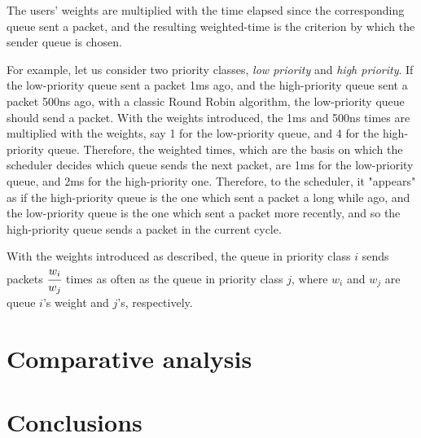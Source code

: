 \documentclass[12pt]{article}
\begin{document}
        The users' weights are multiplied with the time elapsed since the corresponding queue sent a packet, and the resulting weighted-time is the criterion by which the sender queue is chosen.

        For example, let us consider two priority classes, \textit{low priority} and \textit{high priority}. If the low-priority queue sent a packet 1ms ago, and the high-priority queue sent a packet 500ns ago, with a classic Round Robin algorithm, the low-priority queue should send a packet. With the weights introduced, the 1ms and 500ns times are multiplied with the weights, say 1 for the low-priority queue, and 4 for the high-priority queue. Therefore, the weighted times, which are the basis on which the scheduler decides which queue sends the next packet, are 1ms for the low-priority queue, and 2ms for the high-priority one. Therefore, to the scheduler, it "appears" as if the high-priority queue is the one which sent a packet a long while ago, and the low-priority queue is the one which sent a packet more recently, and so the high-priority queue sends a packet in the current cycle.

        With the weights introduced as described, the queue in priority class $i$ sends packets $\cfrac{w_i}{w_j}$ times as often as the queue in priority class $j$, where $w_i$ and $w_j$ are queue $i$'s weight and $j$'s, respectively.
    
    \section{Comparative analysis}
    \blindtext
    \pagebreak

    \section{Conclusions}
    \blindtext
    \pagebreak
\end{document}
